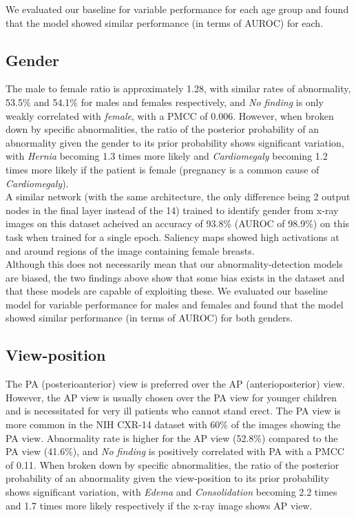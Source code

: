 \documentclass[oneside,a4paper]{article}
\begin{document}
We evaluated our baseline for variable performance for each age group and found that the model showed similar performance (in terms of AUROC) for each.

\subsection{Gender}
The male to female ratio is approximately 1.28, with similar rates of abnormality, 53.5\% and 54.1\% for males and females respectively, and \emph{No finding} is only weakly correlated with \emph{female}, with a PMCC of 0.006.
However, when broken down by specific abnormalities, the ratio of the posterior probability of an abnormality given the gender to its prior probability shows significant variation, with \emph{Hernia} becoming 1.3 times more likely and \emph{Cardiomegaly} becoming 1.2 times more likely if the patient is female (pregnancy is a common cause of \emph{Cardiomegaly}).\\

A similar network (with the same architecture, the only difference being 2 output nodes in the final layer instead of the 14) trained to identify gender from x-ray images on this dataset acheived an accuracy of 93.8\% (AUROC of 98.9\%) on this task when trained for a single epoch. Saliency maps showed high activations at and around regions of the image containing female breasts.\\

Although this does not necessarily mean that our abnormality-detection models are biased, the two findings above show that some bias exists in the dataset and that these models are capable of exploiting these. We evaluated our baseline model for variable performance for males and females and found that the model showed similar performance (in terms of AUROC) for both genders.

\subsection{View-position}
The PA (posterioanterior) view is preferred over the AP (anterioposterior) view. However, the AP view is usually chosen over the PA view for younger children and is necessitated for very ill patients who cannot stand erect. The PA view is more common in the NIH CXR-14 dataset with 60\% of the images showing the PA view. Abnormality rate is higher for the AP view (52.8\%) compared to the PA view (41.6\%), and \emph{No finding} is positively correlated with PA with a PMCC of 0.11. When broken down by specific abnormalities, the ratio of the posterior probability of an abnormality given the view-position to its prior probability shows significant variation, with \emph{Edema} and \emph{Consolidation} becoming 2.2 times and 1.7 times more likely respectively if the x-ray image shows AP view.\\
\end{document}
